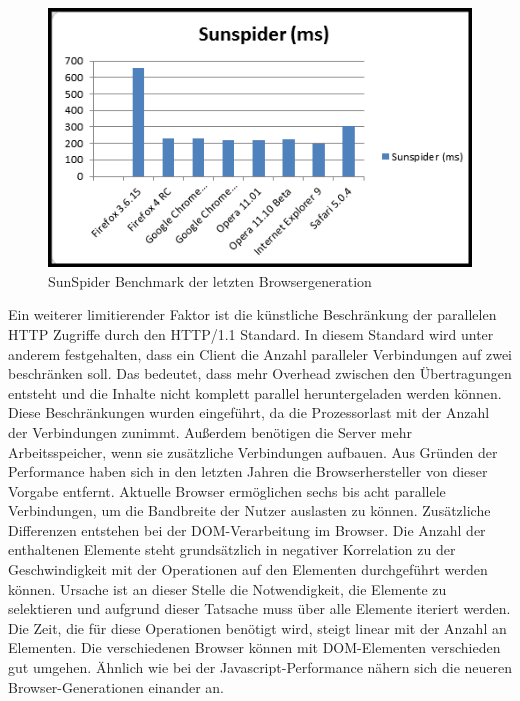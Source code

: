 \begin{figure}[!ht]
  \centering
  \includegraphics[width=1.1\textwidth]{material/sunspiderbenchmark.png}
  \caption{SunSpider Benchmark der letzten Browsergeneration}
  \label{fig:sunspider}
\end{figure}
Ein weiterer limitierender Faktor ist die künstliche Beschränkung der parallelen HTTP Zugriffe durch den HTTP/1.1 Standard. In diesem Standard wird unter anderem festgehalten, dass ein Client die Anzahl paralleler Verbindungen auf zwei beschränken soll. \citep{Fielding1999}
Das bedeutet, dass mehr Overhead zwischen den Übertragungen entsteht und die Inhalte nicht komplett parallel heruntergeladen werden k\"onnen. Diese Beschränkungen wurden eingeführt, da die Prozessorlast mit der Anzahl der Verbindungen zunimmt. Außerdem benötigen die Server mehr Arbeitsspeicher, wenn sie zusätzliche Verbindungen aufbauen. Aus Gr\"unden der Performance haben sich in den letzten Jahren die Browserhersteller von dieser Vorgabe entfernt. Aktuelle Browser ermöglichen sechs bis acht parallele Verbindungen, um die Bandbreite der Nutzer auslasten zu können. Zus\"atzliche Differenzen entstehen bei der DOM-Verarbeitung im Browser. Die Anzahl der enthaltenen Elemente steht grunds\"atzlich in negativer Korrelation zu der Geschwindigkeit mit der Operationen auf den Elementen durchgef\"uhrt werden k\"onnen. Ursache ist an dieser Stelle die Notwendigkeit, die Elemente zu selektieren und aufgrund dieser Tatsache muss \"uber alle Elemente iteriert werden. Die Zeit, die f\"ur diese Operationen ben\"otigt wird, steigt linear mit der Anzahl an Elementen.\citep{YahooDevNetwork2011}
Die verschiedenen Browser k\"onnen mit DOM-Elementen verschieden gut umgehen. \"Ahnlich wie bei der Javascript-Performance n\"ahern sich die neueren Browser-Generationen einander an.

